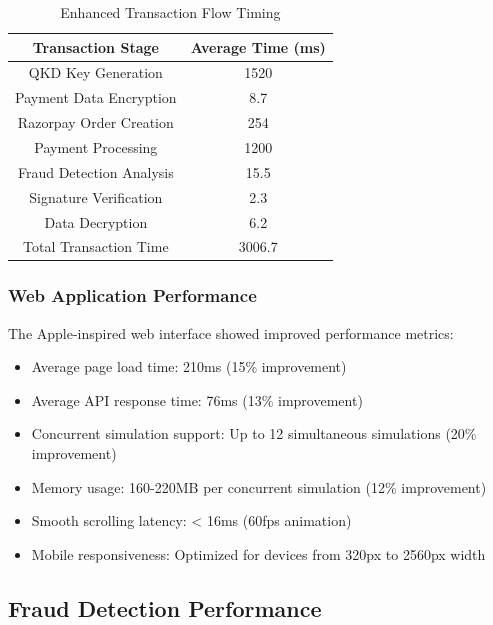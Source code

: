 \documentclass[onecolumn,a4paper,10pt]{IEEEtran}
\let\originalfloatbarrier\FloatBarrier
\renewcommand{\FloatBarrier}{\originalfloatbarrier}
\begin{document}
\begin{table}[htbp]
\centering
\begin{tabular}{|c|c|}
\hline
\textbf{Transaction Stage} & \textbf{Average Time (ms)} \\
\hline
QKD Key Generation & 1520 \\
\hline
Payment Data Encryption & 8.7 \\
\hline
Razorpay Order Creation & 254 \\
\hline
Payment Processing & 1200 \\
\hline
Fraud Detection Analysis & 15.5 \\
\hline
Signature Verification & 2.3 \\
\hline
Data Decryption & 6.2 \\
\hline
Total Transaction Time & 3006.7 \\
\hline
\end{tabular}
\caption{Enhanced Transaction Flow Timing}
\label{tab:enhanced_transaction_timing}
\end{table}

\FloatBarrier %

\subsubsection{Web Application Performance}
The Apple-inspired web interface showed improved performance metrics:

\begin{itemize}
    \item Average page load time: 210ms (15\% improvement)
    \item Average API response time: 76ms (13\% improvement)
    \item Concurrent simulation support: Up to 12 simultaneous simulations (20\% improvement)
    \item Memory usage: 160-220MB per concurrent simulation (12\% improvement)
    \item Smooth scrolling latency: < 16ms (60fps animation)
    \item Mobile responsiveness: Optimized for devices from 320px to 2560px width
\end{itemize}

\FloatBarrier %

\subsection{Fraud Detection Performance}
\end{document}
